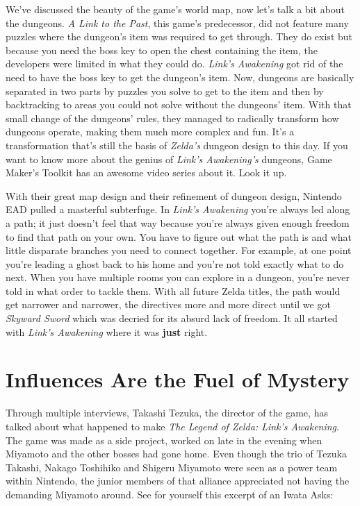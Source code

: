 \documentclass{book}
\begin{document}
We’ve discussed the beauty of the game’s world map, now let’s talk a bit about the dungeons. \emph{A Link to the Past}, this game’s predecessor, did not feature many puzzles where the dungeon’s item was required to get through. They do exist but because you need the boss key to open the chest containing the item, the developers were limited in what they could do. \emph{Link’s Awakening} got rid of the need to have the boss key to get the dungeon’s item. Now, dungeons are basically separated in two parts by puzzles you solve to get to the item and then by backtracking to areas you could not solve without the dungeons’ item. With that small change of the dungeons’ rules, they managed to radically transform how dungeons operate, making them much more complex and fun. It’s a transformation that’s still the basis of \emph{Zelda’s} dungeon design to this day. If you want to know more about the genius of \emph{Link’s Awakening’s} dungeons, Game Maker’s Toolkit has an awesome video series about it. Look it up.\par
With their great map design and their refinement of dungeon design, Nintendo EAD pulled a masterful subterfuge. In \emph{Link’s Awakening} you’re always led along a path; it just doesn’t feel that way because you’re always given enough freedom to find that path on your own. You have to figure out what the path is and what little disparate branches you need to connect together. For example, at one point you’re leading a ghost back to his home and you’re not told exactly what to do next. When you have multiple rooms you can explore in a dungeon, you’re never told in what order to tackle them. With all future Zelda titles, the path would get narrower and narrower, the directives more and more direct until we got \emph{Skyward Sword} which was decried for its absurd lack of freedom. It all started with \emph{Link’s Awakening} where it was \textbf{just} right.\par
\FloatBarrier\section*{Influences Are the Fuel of Mystery}
Through multiple interviews, Takashi Tezuka, the director of the game, has talked about what happened to make \emph{The Legend of Zelda: Link’s Awakening}. The game was made as a side project, worked on late in the evening when Miyamoto and the other bosses had gone home. Even though the trio of Tezuka Takashi, Nakago Toshihiko and Shigeru Miyamoto were seen as a power team within Nintendo, the junior members of that alliance appreciated not having the demanding Miyamoto around. See for yourself this excerpt of an Iwata Asks:\par
\end{document}
